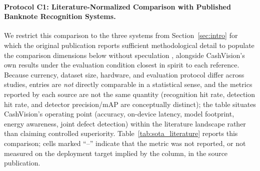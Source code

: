 \documentclass[final,5p,times,twocolumn,authoryear]{elsarticle}
\begin{document}
\paragraph{Protocol C1: Literature-Normalized Comparison with Published Banknote Recognition Systems.}
We restrict this comparison to the three systems from Section~\ref{sec:intro} for which the original publication reports sufficient methodological detail to populate the comparison dimensions below without speculation \cite{Hasanuzzaman2012,Dunai2017,Ghanem2025}, alongside CashVision's own results under the evaluation condition closest in spirit to each reference. Because currency, dataset size, hardware, and evaluation protocol differ across studies, entries are \emph{not} directly comparable in a statistical sense, and the metrics reported by each source are not the same quantity (recognition hit rate, detection hit rate, and detector precision/mAP are conceptually distinct); the table situates CashVision's operating point (accuracy, on-device latency, model footprint, energy awareness, joint defect detection) within the literature landscape rather than claiming controlled superiority. Table~\ref{tab:sota_literature} reports this comparison; cells marked ``--'' indicate that the metric was not reported, or not measured on the deployment target implied by the column, in the source publication.
\end{document}
